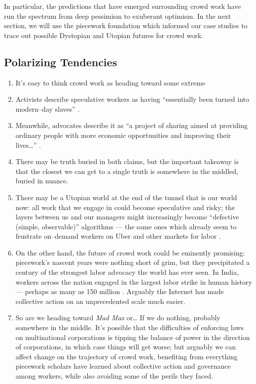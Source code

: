 \documentclass[trackingWork]{subfiles}
\begin{document}
In particular, the predictions that have emerged surrounding crowd work have run the spectrum
from deep pessimism to exuberant optimism. 
In the next section, we will use
the piecework foundation which informed our case studies
to trace out possible Dystopian and Utopian futures for crowd work.

\subsection{Polarizing Tendencies}\label{sec:polarizationOfCrowdWork}
\begin{enumerate}
  \item It's easy to think crowd work as heading toward some extreme
  \item Activists describe speculative workers as having
        ``essentially been turned into modern--day slaves''
        \cite{activistsHuffPoLawsuit}.
  \item Meanwhile, advocates describe it as
        ``a project of sharing
        aimed at providing ordinary people
        with more economic opportunities and
        improving their lives\dots''
        \cite{uberPropaganda}.
  \item There may be truth buried in both claims, but the important takeaway is that
        the closest we can get to a single truth is somewhere in the middled,
        buried in nuance.
  \item There may be a Utopian world at the end of the tunnel that is our world now:
        all work that we engage in could become speculative and risky;
        the layers between us and our managers might increasingly become
        ``defective (simple, observable)'' algorithms \cite{10.2307/2555446}
        --- the same ones which already seem to frustrate
        on--demand workers on Uber and other markets for labor
        \cite{uberAlgorithm,dynamo,turkopticon}.
  \item On the other hand, the future of crowd work could be eminently promising:
        piecework's nascent years were nothing short of grim, but
        they precipitated a century of the strongest labor advocacy the world has ever seen.
        In India, workers across the nation engaged in
        the largest labor strike in human history
        --- perhaps as many as 150 million
        \cite{indiaStrikeRealNews}.
        Arguably the Internet has made collective action on an unprecedented scale much easier.
  \item So are we heading toward \textit{Mad Max} or\dots
        If we do nothing, probably somewhere in the middle.
        It's possible that the difficulties of enforcing laws on multinational corporations is
        tipping the balance of power in the direction of corporations, in which case
        things will get worse;
        but arguably we can affect change on the trajectory of crowd work,
        benefiting from everything piecework scholars have learned about
        collective action and governance
        among workers, while also avoiding some of the perils they faced.
\end{enumerate}
\end{document}

